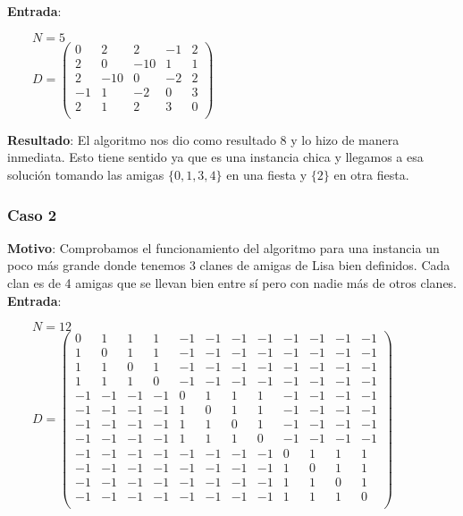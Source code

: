 \textbf{Entrada}:

\begin{flushleft}
$\qquad N = 5$\\[10pt]
$\qquad D = \left( \begin{smallmatrix}
0 & 2 & 2 & -1 & 2 \\
2 & 0 & -10 & 1 & 1 \\
2 & -10 & 0 & -2 & 2 \\
-1 & 1 & -2 & 0 & 3 \\
2 & 1 & 2 & 3 & 0 \\
\end{smallmatrix} \right)$
\end{flushleft}

\textbf{Resultado}: El algoritmo nos dio como resultado 8 y lo hizo de manera inmediata. Esto tiene sentido ya
que es una instancia chica y llegamos a esa solución tomando las amigas $\{ 0, 1, 3, 4 \}$ en una fiesta y $\{ 2 \}$ en otra fiesta.

\subsubsection*{Caso 2}

\textbf{Motivo}: Comprobamos el funcionamiento del algoritmo para una instancia un poco más grande donde tenemos 3 clanes de amigas de Lisa bien definidos. 
Cada clan es de 4 amigas que se llevan bien entre sí pero con nadie más de otros clanes. \\

\textbf{Entrada}:

\begin{flushleft}
$\qquad N = 12$\\[10pt]
$\qquad D = \left( \begin{smallmatrix}
0 & 1 & 1 & 1 & -1 & -1 & -1 & -1 & -1 & -1 & -1 & -1 \\
1 & 0 & 1 & 1 & -1 & -1 & -1 & -1 & -1 & -1 & -1 & -1 \\
1 & 1 & 0 & 1 & -1 & -1 & -1 & -1 & -1 & -1 & -1 & -1 \\
1 & 1 & 1 & 0 & -1 & -1 & -1 & -1 & -1 & -1 & -1 & -1 \\
-1 & -1 & -1 & -1 & 0 & 1 & 1 & 1 & -1 & -1 & -1 & -1 \\
-1 & -1 & -1 & -1 & 1 & 0 & 1 & 1 & -1 & -1 & -1 & -1 \\
-1 & -1 & -1 & -1 & 1 & 1 & 0 & 1 & -1 & -1 & -1 & -1 \\
-1 & -1 & -1 & -1 & 1 & 1 & 1 & 0 & -1 & -1 & -1 & -1 \\
-1 & -1 & -1 & -1 & -1 & -1 & -1 & -1 & 0 & 1 & 1 & 1 \\
-1 & -1 & -1 & -1 & -1 & -1 & -1 & -1 & 1 & 0 & 1 & 1 \\
-1 & -1 & -1 & -1 & -1 & -1 & -1 & -1 & 1 & 1 & 0 & 1 \\
-1 & -1 & -1 & -1 & -1 & -1 & -1 & -1 & 1 & 1 & 1 & 0 \\
\end{smallmatrix} \right)$
\end{flushleft}

